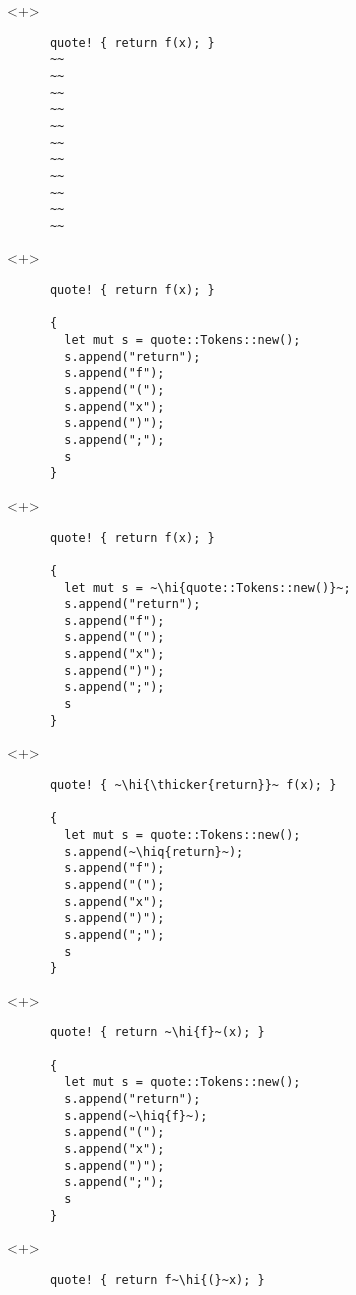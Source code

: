 \documentclass[usepdftitle=false]{beamer}
\renewcommand{\&}{\makebox[\widthof{\ampersand}][c]{\scalebox{0.9}[1.0]{\Book\ampersand}}}
\newcommand{\+}{\makebox[\widthof{+}][c]{\raisebox{-.2\height}{\scalefont{1.5}\Light+}}}
\newcommand{\thicker}[1]{\contourlength{0.26pt}\contour[10]{black}{#1}}
\newcommand{\hi}[1]{%
\tikz[baseline=(A.base)]
 \node[highlighting=0,inner sep=0pt,text depth=0pt] (A) {#1};%
}
\newcommand{\hiq}[1]{\hi{''#1''}}
\begin{document}
\begin{frame}[fragile]
  \begin{onlyenv}<+>
    \begin{verbatim}
      quote! { return f(x); }
      ~~
      ~~
      ~~
      ~~
      ~~
      ~~
      ~~
      ~~
      ~~
      ~~
      ~~
    \end{verbatim}
  \end{onlyenv}
  \begin{onlyenv}<+>
    \begin{verbatim}
      quote! { return f(x); }

      {
        let mut s = quote::Tokens::new();
        s.append("return");
        s.append("f");
        s.append("(");
        s.append("x");
        s.append(")");
        s.append(";");
        s
      }
    \end{verbatim}
  \end{onlyenv}
  \begin{onlyenv}<+>
    \begin{verbatim}
      quote! { return f(x); }

      {
        let mut s = ~\hi{quote::Tokens::new()}~;
        s.append("return");
        s.append("f");
        s.append("(");
        s.append("x");
        s.append(")");
        s.append(";");
        s
      }
    \end{verbatim}
  \end{onlyenv}
  \begin{onlyenv}<+>
    \begin{verbatim}
      quote! { ~\hi{\thicker{return}}~ f(x); }

      {
        let mut s = quote::Tokens::new();
        s.append(~\hiq{return}~);
        s.append("f");
        s.append("(");
        s.append("x");
        s.append(")");
        s.append(";");
        s
      }
    \end{verbatim}
  \end{onlyenv}
  \begin{onlyenv}<+>
    \begin{verbatim}
      quote! { return ~\hi{f}~(x); }

      {
        let mut s = quote::Tokens::new();
        s.append("return");
        s.append(~\hiq{f}~);
        s.append("(");
        s.append("x");
        s.append(")");
        s.append(";");
        s
      }
    \end{verbatim}
  \end{onlyenv}
  \begin{onlyenv}<+>
    \begin{verbatim}
      quote! { return f~\hi{(}~x); }


\end{verbatim}
\end{onlyenv}
\end{frame}
\end{document}
